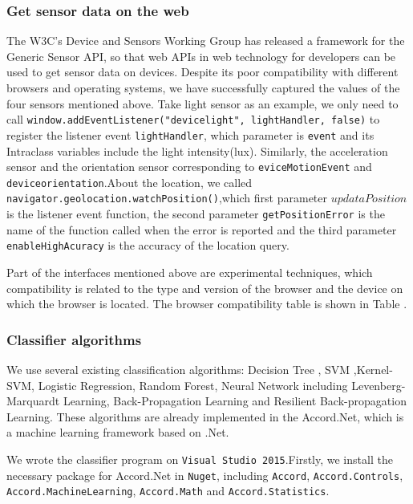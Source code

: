 \subsubsection{Get sensor data on the web}

The W3C's Device and Sensors Working Group has released a framework for the Generic Sensor API, so that web APIs in web technology for developers can be used to get sensor data on devices. Despite its poor compatibility with different browsers and operating systems, we have successfully captured the values of the four sensors mentioned above. Take light sensor as an example, we only need to call \texttt{window.addEventListener("devicelight", lightHandler, false)} to register the listener event \texttt{lightHandler}, which parameter is \texttt{event} and its Intraclass variables include the light intensity(lux). Similarly, the acceleration sensor and the orientation sensor corresponding to \texttt{eviceMotionEvent} and \texttt{deviceorientation}.About the location, we called \texttt{navigator.geolocation.watchPosition()},which first parameter \texttt{$updataPosition$} is the listener event function, the second parameter \texttt{getPositionError} is the name of the function called when the error is reported and the third parameter \texttt{enableHighAcuracy} is the accuracy of the location query.



Part of the interfaces mentioned above are experimental techniques, which compatibility is related to the type and version of the browser and the device on which the browser is located. The browser compatibility table is shown in Table \uppercase\expandafter{}.





\subsubsection{Classifier algorithms}

We use several existing classification algorithms: Decision Tree , SVM ,Kernel-SVM, Logistic Regression, Random Forest, Neural Network including Levenberg-Marquardt Learning, Back-Propagation Learning and Resilient Back-propagation Learning. These algorithms are already implemented in the Accord.Net\cite{accord}, which is a machine learning framework based on .Net.




We wrote the classifier program on \texttt{Visual Studio 2015}.Firstly, we install the necessary package for Accord.Net in \texttt{Nuget}, including \texttt{Accord}, \texttt{Accord.Controls}, \texttt{Accord.MachineLearning}, \texttt{Accord.Math} and \texttt{Accord.Statistics}.




